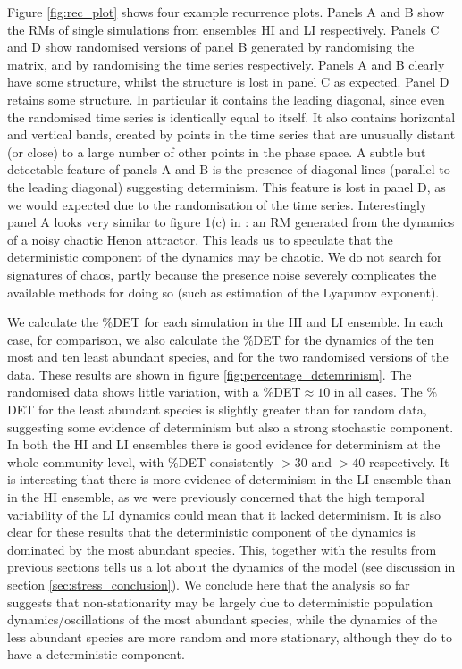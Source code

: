 Figure \ref{fig:rec_plot} shows four example recurrence plots. Panels A and B show the RMs of single simulations from ensembles HI and LI respectively. Panels C and D show randomised versions of panel B generated by randomising the matrix, and by randomising the time series respectively. Panels A and B clearly have some structure, whilst the structure is lost in panel C as expected. Panel D retains some structure. In particular it contains the leading diagonal, since even the randomised time series is identically equal to itself. It also contains horizontal and vertical bands, created by points in the time series that are unusually distant (or close) to a large number of other points in the phase space. A subtle but detectable feature of panels A and B is the presence of diagonal lines (parallel to the leading diagonal) suggesting determinism. This feature is lost in panel D, as we would expected due to the randomisation of the time series. Interestingly panel A looks very similar to figure 1(c) in \cite{aparicio2008detecting}: an RM generated from the dynamics of a noisy chaotic Henon attractor. This leads us to speculate that the deterministic component of the dynamics may be chaotic. We do not search for signatures of chaos, partly because the presence noise severely complicates the available methods for doing so (such as estimation of the Lyapunov exponent)\cite{saul09phd}.

We calculate the $\%$DET for each simulation in the HI and LI ensemble. In each case, for comparison, we also calculate the $\%$DET for the dynamics of the ten most and ten least abundant species, and for the two randomised versions of the data. These results are shown in figure \ref{fig:percentage_detemrinism}. The randomised data shows little variation, with a $\%$DET$ \approx 10$ in all cases.  The $\%$DET for the least abundant species is slightly greater than for random data, suggesting some evidence of determinism but also a strong stochastic component. In both the HI and LI ensembles there is good evidence for determinism at the whole community level, with $\%$DET consistently $>30$ and $>40$ respectively. It is interesting that there is more evidence of determinism in the LI ensemble than in the HI ensemble, as we were previously concerned that the high temporal variability of the LI dynamics could mean that it lacked determinism. It is also clear for these results that the deterministic component of the dynamics is dominated by the most abundant species. This, together with the results from previous sections tells us a lot about the dynamics of the model (see discussion in section \ref{sec:stress_conclusion}). We conclude here that the analysis so far suggests that non-stationarity may be largely due to deterministic population dynamics/oscillations of the most abundant species, while the dynamics of the less abundant species are more random and more stationary, although they do to have a deterministic component.  

